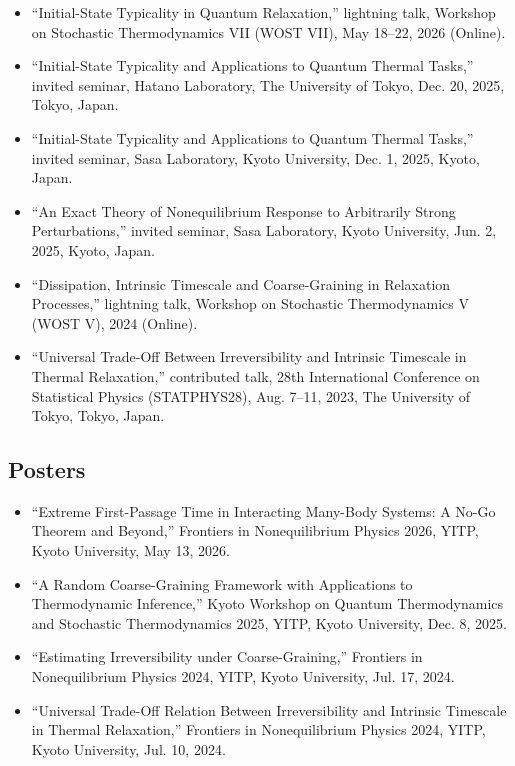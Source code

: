 \documentclass[10pt,a4paper]{article}
\begin{document}
\begin{itemize}
  \item ``Initial-State Typicality in Quantum Relaxation,'' lightning talk, Workshop on Stochastic Thermodynamics VII (WOST VII), May 18--22, 2026 (Online).
  \item ``Initial-State Typicality and Applications to Quantum Thermal Tasks,'' invited seminar, Hatano Laboratory, The University of Tokyo, Dec. 20, 2025, Tokyo, Japan.
  \item ``Initial-State Typicality and Applications to Quantum Thermal Tasks,'' invited seminar, Sasa Laboratory, Kyoto University, Dec. 1, 2025, Kyoto, Japan.
  \item ``An Exact Theory of Nonequilibrium Response to Arbitrarily Strong Perturbations,'' invited seminar, Sasa Laboratory, Kyoto University, Jun. 2, 2025, Kyoto, Japan.
  \item ``Dissipation, Intrinsic Timescale and Coarse-Graining in Relaxation Processes,'' lightning talk, Workshop on Stochastic Thermodynamics V (WOST V), 2024 (Online).
  \item ``Universal Trade-Off Between Irreversibility and Intrinsic Timescale in Thermal Relaxation,'' contributed talk, 28th International Conference on Statistical Physics (STATPHYS28), Aug. 7--11, 2023, The University of Tokyo, Tokyo, Japan.
\end{itemize}

\subsection{Posters}

\begin{itemize}
  \item ``Extreme First-Passage Time in Interacting Many-Body Systems: A No-Go Theorem and Beyond,'' Frontiers in Nonequilibrium Physics 2026, YITP, Kyoto University, May 13, 2026.
  \item ``A Random Coarse-Graining Framework with Applications to Thermodynamic Inference,'' Kyoto Workshop on Quantum Thermodynamics and Stochastic Thermodynamics 2025, YITP, Kyoto University, Dec. 8, 2025.
  \item ``Estimating Irreversibility under Coarse-Graining,'' Frontiers in Nonequilibrium Physics 2024, YITP, Kyoto University, Jul. 17, 2024.
  \item ``Universal Trade-Off Relation Between Irreversibility and Intrinsic Timescale in Thermal Relaxation,'' Frontiers in Nonequilibrium Physics 2024, YITP, Kyoto University, Jul. 10, 2024.
\end{itemize}
\end{document}

